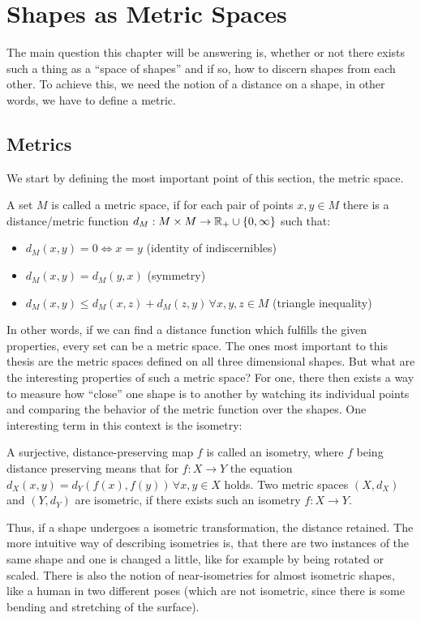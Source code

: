 \chapter{Shapes as Metric Spaces}
\label{chapter:shapeSpaces}
The main question this chapter will be answering is, whether or not there exists such a thing as a ``space of shapes'' and if so, how to discern shapes from each other.
To achieve this, we need the notion of a distance on a shape, in other words, we have to define a metric.

\section{Metrics}
We start by defining the most important point of this section, the metric space.
\begin{mydef}
	A set $M$ is called a metric space, if for each pair of points $x,y \in M$ there is a distance/metric function $d_M: M \times M \rightarrow \mathbb{R}_+ \cup \{0,\infty\}$ such that:
	\begin{itemize}
		\item $d_M(x,y) = 0 \Leftrightarrow x = y$ (identity of indiscernibles)
		\item $d_M(x,y) = d_M(y,x)$ (symmetry)
		\item $d_M(x,y) \le d_M(x,z) + d_M(z,y)\,\forall x,y,z \in M$ (triangle inequality)
	\end{itemize}
\end{mydef}
In other words, if we can find a distance function which fulfills the given properties, every set can be a metric space.
The ones most important to this thesis are the metric spaces defined on all three dimensional shapes.
But what are the interesting properties of such a metric space?
For one, there then exists a way to measure how ``close'' one shape is to another by watching its individual points and comparing the behavior of the metric function over the shapes.
One interesting term in this context is the isometry:
\begin{mydef}
	A surjective, distance-preserving map $f$ is called an isometry, where $f$ being distance preserving means that for $f :X \rightarrow Y$ the equation $d_X(x,y) = d_Y(f(x),f(y)) \,\forall x,y \in X$ holds.
	Two metric spaces $(X,d_X)$ and $(Y,d_Y)$ are isometric, if there exists such an isometry $f :X \rightarrow Y$.
\end{mydef}
Thus, if a shape undergoes a isometric transformation, the distance retained.
The more intuitive way of describing isometries is, that there are two instances of the same shape and one is changed a little, like for example by being rotated or scaled.
There is also the notion of near-isometries for almost isometric shapes, like a human in two different poses (which are not isometric, since there is some bending and stretching of the surface).

